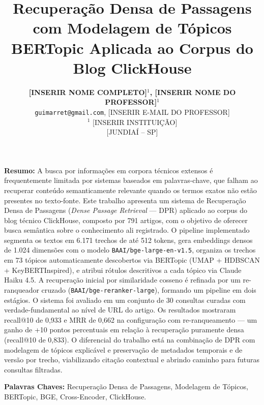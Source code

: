 \documentclass[11pt,a4paper]{article}
\title{\textbf{Recuperação Densa de Passagens com Modelagem de Tópicos BERTopic Aplicada ao Corpus do Blog ClickHouse}}
\author{
  \textbf{[INSERIR NOME COMPLETO]$^{1}$, [INSERIR NOME DO PROFESSOR]$^{1}$} \\
  \texttt{guimarret@gmail.com}, [INSERIR E-MAIL DO PROFESSOR] \\[0.4em]
  $^{1}$ [INSERIR INSTITUIÇÃO] \\
  {}[JUNDIAÍ -- SP]
}
\date{}
\begin{document}
\maketitle

\noindent \textbf{Resumo:} A busca por informações em corpora técnicos extensos é frequentemente limitada por sistemas baseados em palavras-chave, que falham ao recuperar conteúdo semanticamente relevante quando os termos exatos não estão presentes no texto-fonte. Este trabalho apresenta um sistema de Recuperação Densa de Passagens (\textit{Dense Passage Retrieval} --- DPR) aplicado ao corpus do blog técnico ClickHouse, composto por 791 artigos, com o objetivo de oferecer busca semântica sobre o conhecimento ali registrado. O pipeline implementado segmenta os textos em 6.171 trechos de até 512 tokens, gera embeddings densos de 1.024 dimensões com o modelo \texttt{BAAI/bge-large-en-v1.5}, organiza os trechos em 73 tópicos automaticamente descobertos via BERTopic (UMAP + HDBSCAN + KeyBERTInspired), e atribui rótulos descritivos a cada tópico via Claude Haiku 4.5. A recuperação inicial por similaridade cosseno é refinada por um re-ranqueador cruzado (\texttt{BAAI/bge-reranker-large}), formando um pipeline em dois estágios. O sistema foi avaliado em um conjunto de 30 consultas curadas com verdade-fundamental ao nível de URL do artigo. Os resultados mostraram recall@10 de 0,933 e MRR de 0,662 na configuração com re-ranqueamento --- um ganho de +10 pontos percentuais em relação à recuperação puramente densa (recall@10 de 0,833). O diferencial do trabalho está na combinação de DPR com modelagem de tópicos explicável e preservação de metadados temporais e de versão por trecho, viabilizando citação contextual e abrindo caminho para futuras consultas filtradas.

\vspace{0.5em}
\noindent \textbf{Palavras Chaves:} Recuperação Densa de Passagens, Modelagem de Tópicos, BERTopic, BGE, Cross-Encoder, ClickHouse.
\end{document}
